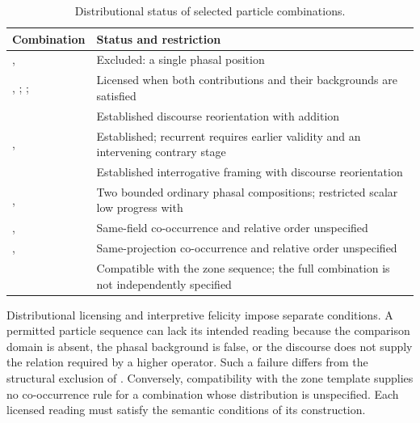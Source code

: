 \begin{table}[ht]
\footnotesize
\caption{Distributional status of selected particle combinations.}\label{tab:particle-combination-status}
\begin{tabularx}{\textwidth}{L L}
\toprule
Combination & Status and restriction \\
\midrule
{},  & Excluded: a single phasal position \\
, ; ;  &
Licensed when both contributions and their backgrounds are satisfied \\
 &
Established discourse reorientation with addition \\
,  &
Established; recurrent  requires earlier validity and an intervening contrary stage \\
 &
Established interrogative framing with discourse reorientation \\
,  &
Two bounded ordinary phasal compositions; restricted scalar low progress with  \\
,  &
Same-field co-occurrence and relative order unspecified \\
,  &
Same-projection co-occurrence and relative order unspecified \\
 &
Compatible with the zone sequence; the full combination is not independently specified \\
\bottomrule
\end{tabularx}
\end{table}

Distributional licensing and interpretive felicity impose separate
conditions. A permitted particle sequence can lack its intended reading
because the comparison domain is absent, the phasal background is false,
or the discourse does not supply the relation required by a higher operator.
Such a failure differs from the structural exclusion of .
Conversely, compatibility with the zone template supplies no co-occurrence
rule for a combination whose distribution is unspecified. Each licensed
reading must satisfy the semantic conditions of its construction.

